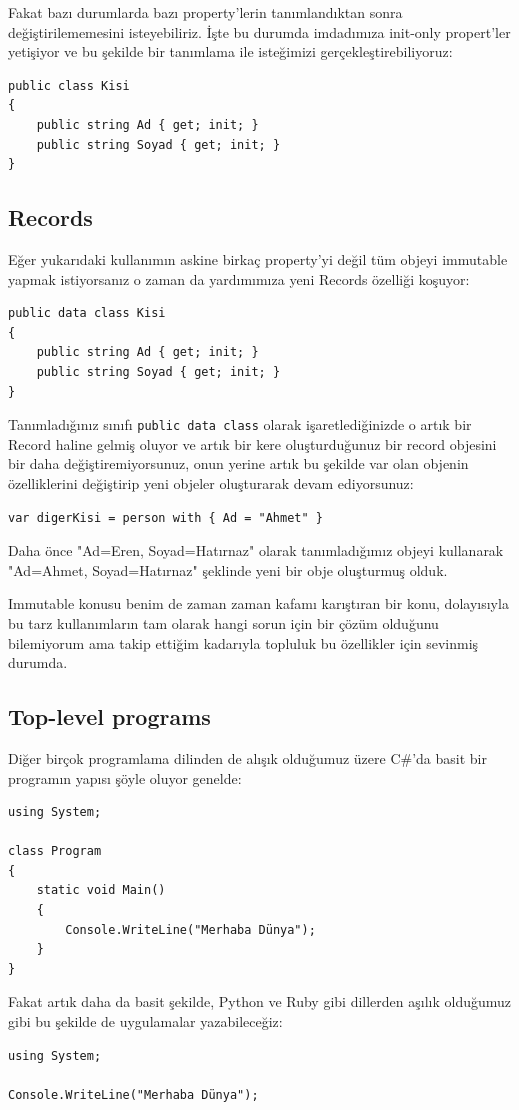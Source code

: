 \documentclass[11pt]{article}
\begin{document}
Fakat bazı durumlarda bazı property'lerin tanımlandıktan sonra
değiştirilememesini isteyebiliriz. İşte bu durumda imdadımıza init-only
propert'ler yetişiyor ve bu şekilde bir tanımlama ile isteğimizi
gerçekleştirebiliyoruz:
\begin{verbatim}
public class Kisi
{
    public string Ad { get; init; }
    public string Soyad { get; init; }
}
\end{verbatim}
\subsection{Records}
\label{sec:org77e4469}
Eğer yukarıdaki kullanımın askine birkaç property'yi değil tüm objeyi
immutable yapmak istiyorsanız o zaman da yardımımıza yeni Records özelliği
koşuyor:
\begin{verbatim}
public data class Kisi
{
    public string Ad { get; init; }
    public string Soyad { get; init; }
}
\end{verbatim}
Tanımladığınız sınıfı \texttt{public data class} olarak işaretlediğinizde o artık
bir Record haline gelmiş oluyor ve artık bir kere oluşturduğunuz bir record
objesini bir daha değiştiremiyorsunuz, onun yerine artık bu şekilde var olan
objenin özelliklerini değiştirip yeni objeler oluşturarak devam ediyorsunuz:
\begin{verbatim}
var digerKisi = person with { Ad = "Ahmet" }
\end{verbatim}
Daha önce "Ad=Eren, Soyad=Hatırnaz" olarak tanımladığımız objeyi kullanarak
"Ad=Ahmet, Soyad=Hatırnaz" şeklinde yeni bir obje oluşturmuş olduk.

Immutable konusu benim de zaman zaman kafamı karıştıran bir konu, dolayısıyla
bu tarz kullanımların tam olarak hangi sorun için bir çözüm olduğunu
bilemiyorum ama takip ettiğim kadarıyla topluluk bu özellikler için sevinmiş
durumda.
\subsection{Top-level programs}
\label{sec:org389c5e8}
Diğer birçok programlama dilinden de alışık olduğumuz üzere C\#'da basit bir
programın yapısı şöyle oluyor genelde:
\begin{verbatim}
using System;

class Program
{
    static void Main()
    {
        Console.WriteLine("Merhaba Dünya");
    }
}
\end{verbatim}
Fakat artık daha da basit şekilde, Python ve Ruby gibi dillerden aşılık
olduğumuz gibi bu şekilde de uygulamalar yazabileceğiz:
\begin{verbatim}
using System;

Console.WriteLine("Merhaba Dünya");
\end{verbatim}
\end{document}
